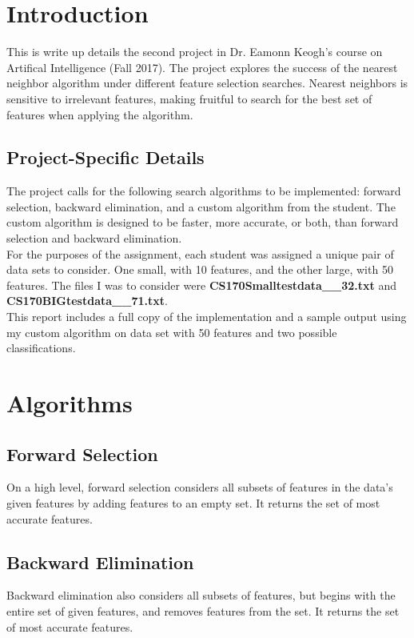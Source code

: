 \documentclass{article}
\begin{document}
\section{Introduction}
This is write up details the second project in Dr. Eamonn Keogh's course on Artifical
Intelligence (Fall 2017). The project explores the success of the nearest neighbor
algorithm under different feature selection searches. Nearest neighbors
is sensitive to irrelevant features, making fruitful to search for
the best set of features when applying the algorithm.

\subsection{Project-Specific Details}
The project calls for the following search algorithms to be implemented: forward selection, backward
elimination, and a custom algorithm from the student. The custom algorithm is
designed to be faster, more accurate, or both, than forward selection and
backward elimination. \\

For the purposes of the assignment, each student was assigned a unique pair of data
sets to consider. One small, with 10 features, and the other large, with 50
features. The files I was to consider were \textbf{CS170Smalltestdata\_\_32.txt}
and \textbf{CS170BIGtestdata\_\_71.txt}. \\

This report includes a full copy of the implementation and a sample output using
my custom algorithm on data set with 50 features and two possible classifications.

\section{Algorithms}
\subsection{Forward Selection}
On a high level, forward selection considers all subsets of features in the
data's given features by adding features to an empty set. It returns the set of
most accurate features.

\subsection{Backward Elimination}
Backward elimination also considers all subsets of features, but begins with the
entire set of given features, and removes features from the set. It returns the
set of most accurate features.
\end{document}
